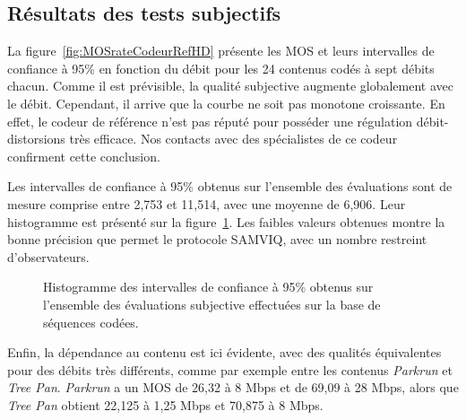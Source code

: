 \subsection{Résultats des tests subjectifs}
La figure~\ref{fig:MOSrateCodeurRefHD} présente les MOS et leurs intervalles de confiance à 95\% en fonction du débit pour les 24 contenus codés à sept débits chacun. Comme il est prévisible, la qualité subjective augmente globalement avec le débit. Cependant, il arrive que la courbe ne soit pas monotone croissante. En effet, le codeur de référence n'est pas réputé pour posséder une régulation débit-distorsions très efficace. Nos contacts avec des spécialistes de ce codeur confirment cette conclusion.

Les intervalles de confiance à 95\% obtenus sur l'ensemble des évaluations sont de mesure comprise entre 2,753 et 11,514, avec une moyenne de 6,906. Leur histogramme est présenté sur la figure~\ref{fig:histoIC}. Les faibles valeurs obtenues montre la bonne précision que permet le protocole SAMVIQ, avec un nombre restreint d'observateurs.

\begin{figure}[htbp]
\centering
{}
\caption{Histogramme des intervalles de confiance à 95\% obtenus sur l'ensemble des évaluations subjective effectuées sur la base de séquences codées.}
\label{fig:histoIC}
\end{figure}

Enfin, la dépendance au contenu est ici évidente, avec des qualités équivalentes pour des débits très différents, comme par exemple entre les contenus \emph{Parkrun} et \emph{Tree Pan}. \emph{Parkrun} a un MOS de 26,32 à 8 Mbps et de 69,09 à 28 Mbps, alors que \emph{Tree Pan} obtient 22,125 à 1,25 Mbps et 70,875 à 8 Mbps.

